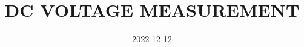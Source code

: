 \documentclass[a4paper]{article}
\title{DC VOLTAGE MEASUREMENT}
\date{2022-12-12}
\begin{document}

\maketitle
\tableofcontents
\pagebreak





\end{document}
